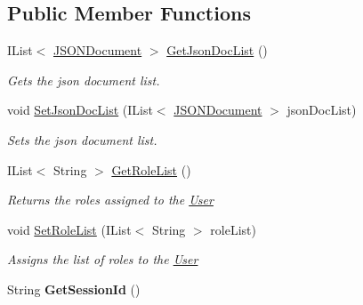 \subsection*{Public Member Functions}
\begin{DoxyCompactItemize}
\item 
I\+List$<$ \hyperlink{classcom_1_1shephertz_1_1app42_1_1paas_1_1sdk_1_1csharp_1_1user_1_1_user_1_1_j_s_o_n_document}{J\+S\+O\+N\+Document} $>$ \hyperlink{classcom_1_1shephertz_1_1app42_1_1paas_1_1sdk_1_1csharp_1_1user_1_1_user_ad90e4b70b9507a96fc576cb9e0b402ff}{Get\+Json\+Doc\+List} ()
\begin{DoxyCompactList}\small\item\em Gets the json document list. \end{DoxyCompactList}\item 
void \hyperlink{classcom_1_1shephertz_1_1app42_1_1paas_1_1sdk_1_1csharp_1_1user_1_1_user_adbfe53e8c9368aad197e6c2b97b0c1e8}{Set\+Json\+Doc\+List} (I\+List$<$ \hyperlink{classcom_1_1shephertz_1_1app42_1_1paas_1_1sdk_1_1csharp_1_1user_1_1_user_1_1_j_s_o_n_document}{J\+S\+O\+N\+Document} $>$ json\+Doc\+List)
\begin{DoxyCompactList}\small\item\em Sets the json document list. \end{DoxyCompactList}\item 
I\+List$<$ String $>$ \hyperlink{classcom_1_1shephertz_1_1app42_1_1paas_1_1sdk_1_1csharp_1_1user_1_1_user_a763fe4f69456d6b939ce37a4e705f05e}{Get\+Role\+List} ()
\begin{DoxyCompactList}\small\item\em Returns the roles assigned to the \hyperlink{classcom_1_1shephertz_1_1app42_1_1paas_1_1sdk_1_1csharp_1_1user_1_1_user}{User} \end{DoxyCompactList}\item 
void \hyperlink{classcom_1_1shephertz_1_1app42_1_1paas_1_1sdk_1_1csharp_1_1user_1_1_user_ac438875b4d553cc84799d09dd0f6c713}{Set\+Role\+List} (I\+List$<$ String $>$ role\+List)
\begin{DoxyCompactList}\small\item\em Assigns the list of roles to the \hyperlink{classcom_1_1shephertz_1_1app42_1_1paas_1_1sdk_1_1csharp_1_1user_1_1_user}{User} \end{DoxyCompactList}\item 
\hypertarget{classcom_1_1shephertz_1_1app42_1_1paas_1_1sdk_1_1csharp_1_1user_1_1_user_a0f8c61cc954195a8e15fe28e92fc0562}{String {\bfseries Get\+Session\+Id} ()}\label{classcom_1_1shephertz_1_1app42_1_1paas_1_1sdk_1_1csharp_1_1user_1_1_user_a0f8c61cc954195a8e15fe28e92fc0562}


\end{DoxyCompactItemize}
